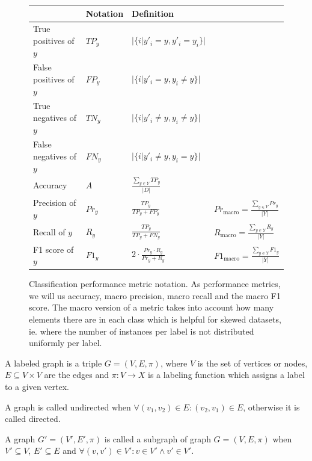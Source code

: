 \begin{figure}[ht]
\centering
\renewcommand*{\arraystretch}{2.1}
\begin{tabular}{llll}
 & Notation & Definition & \\
\toprule
True positives of $y$ &
$TP_y$ &
$\displaystyle |\{i | y'_i = y, y'_i = y_i \}|$ &
\\
False positives of $y$ &
$FP_y$ &
$\displaystyle |\{i | y'_i = y, y_i \neq y \}|$ &
\\
True negatives of $y$ &
$TN_y$ &
$\displaystyle |\{i | y'_i \neq y, y_i \neq y\}|$ &
\\
False negatives of $y$ &
$FN_y$ &
$\displaystyle |\{i | y'_i \neq y, y_i = y\}|$ &
\\
\midrule
Accuracy &
$A$ &
$\displaystyle \frac{\sum\nolimits_{y \in Y} TP_y}{|D|}$ &
\\
Precision of $y$ &
$Pr_y$ &
$\displaystyle \frac{TP_y}{TP_y + FP_y} $ &
$Pr_{\text{macro}} = \displaystyle \frac{\sum\nolimits_{y \in Y} Pr_y}{|Y|}$
\\
Recall of $y$ &
$R_y$ &
$\displaystyle \frac{TP_y}{TP_y + FN_y}$ &
$R_{\text{macro}} = \displaystyle \frac{\sum\nolimits_{y \in Y} R_y}{|Y|}$
\\
F1 score of $y$ &
$F1_y$ &
$\displaystyle 2 \cdot \frac{Pr_y \cdot R_y}{Pr_y + R_y}$ &
$F1_{\text{macro}} = \displaystyle \frac{\sum\nolimits_{y \in Y} F1_y}{|Y|}$
\\
\end{tabular}
\caption{Classification performance metric notation. As performance metrics, we will us accuracy, macro precision, macro recall and the macro F1 score. The macro version of a metric takes into account how many elements there are in each class which is helpful for skewed datasets, ie. where the number of instances per label is not distributed uniformly per label.}\label{fig:classification_metrics}
\end{figure}



A labeled graph is a triple $G = (V, E, \pi)$, where $V$ is the set of vertices or nodes, $E \subseteq V \times V$ are the edges and $\pi: V \to X$ is a labeling function which assigns a label to a given vertex.

A graph is called undirected when $\forall (v_1, v_2) \in E: (v_2, v_1) \in E$, otherwise it is called directed.

A graph $G'=(V', E', \pi)$ is called a subgraph of graph $G = (V, E, \pi)$ when $V' \subseteq V$, $E' \subseteq E$ and $\forall (v, v') \in V': v \in V' \land v' \in V'$.

